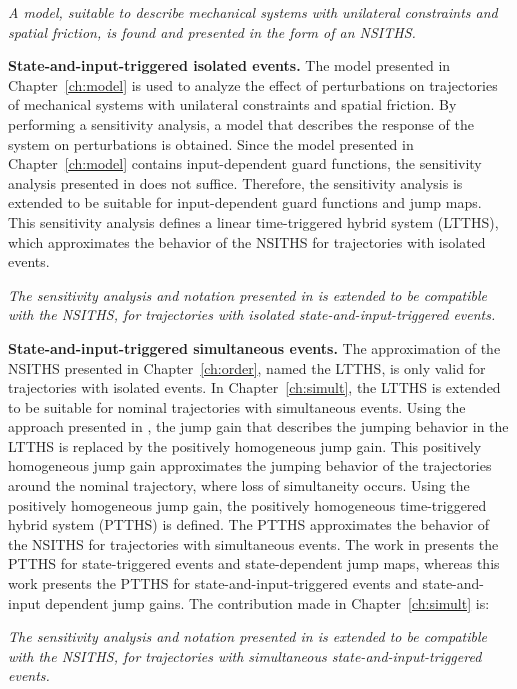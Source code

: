 \documentclass[../DC2017114Bouma.tex]{subfiles}
\begin{document}
\textit{A model, suitable to describe mechanical systems with unilateral constraints and spatial friction, is found and presented in the form of an NSITHS.}

\textbf{State-and-input-triggered isolated events.} The model presented in Chapter~\ref{ch:model} is used to analyze the effect of perturbations on trajectories of mechanical systems with unilateral constraints and spatial friction. By performing a sensitivity analysis, a model that describes the response of the system on perturbations is obtained. Since the model presented in Chapter~\ref{ch:model} contains input-dependent guard functions, the sensitivity analysis presented in \cite{Rijnen2017} does not suffice. Therefore, the sensitivity analysis is extended to be suitable for input-dependent guard functions and jump maps. This sensitivity analysis defines a linear time-triggered hybrid system (LTTHS), which approximates the behavior of the NSITHS for trajectories with isolated events.

\textit{The sensitivity analysis and notation presented in \cite{Rijnen2018a} is extended to be compatible with the NSITHS, for trajectories with isolated state-and-input-triggered events.}

\textbf{State-and-input-triggered simultaneous events.} The approximation of the NSITHS presented in Chapter~\ref{ch:order}, named the LTTHS, is only valid for trajectories with isolated events. In Chapter~\ref{ch:simult}, the LTTHS is extended to be suitable for nominal trajectories with simultaneous events. Using the approach presented in \cite{Rijnen2018}, the jump gain that describes the jumping behavior in the LTTHS is replaced by the positively homogeneous jump gain. This positively homogeneous jump gain approximates the jumping behavior of the trajectories around the nominal trajectory, where loss of simultaneity occurs. Using the positively homogeneous jump gain, the positively homogeneous time-triggered hybrid system (PTTHS) is defined. The PTTHS approximates the behavior of the NSITHS for trajectories with simultaneous events. The work in \cite{Rijnen2018a} presents the PTTHS for state-triggered events and state-dependent jump maps, whereas this work presents the PTTHS for state-and-input-triggered events and state-and-input dependent jump gains. The contribution made in Chapter~\ref{ch:simult} is:

\textit{The sensitivity analysis and notation presented in \cite{Rijnen2018a} is extended to be compatible with the NSITHS, for trajectories with simultaneous state-and-input-triggered events.}
\end{document}

